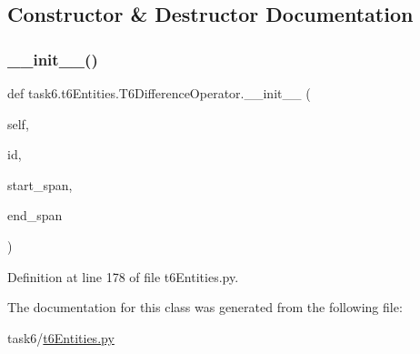 \subsection{Constructor \& Destructor Documentation}
\mbox{\label{classtask6_1_1t6Entities_1_1T6DifferenceOperator_aabe355d243f7c3cac47bece7cb07f3af}} 
\subsubsection{\texorpdfstring{\+\_\+\+\_\+init\+\_\+\+\_\+()}{\_\_init\_\_()}}
{\footnotesize\ttfamily def task6.\+t6\+Entities.\+T6\+Difference\+Operator.\+\_\+\+\_\+init\+\_\+\+\_\+ (\begin{DoxyParamCaption}\item[{}]{self,  }\item[{}]{id,  }\item[{}]{start\+\_\+span,  }\item[{}]{end\+\_\+span }\end{DoxyParamCaption})}



Definition at line 178 of file t6\+Entities.\+py.



The documentation for this class was generated from the following file\+:\begin{DoxyCompactItemize}
\item 
task6/\hyperlink{t6Entities_8py}{t6\+Entities.\+py}\end{DoxyCompactItemize}
